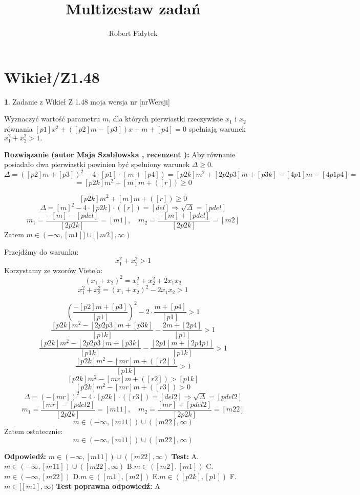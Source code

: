 \documentclass[12pt, a4paper]{article}
\title{Multizestaw zadań}
\author{Robert Fidytek}
\date{}
\theoremstyle{definition} %
\newtheorem{zad}{}
\newcommand{\kategoria}[1]{\section{#1}} %
\newcommand{\zadStart}[1]{\begin{zad}#1\newline} %
\newcommand{\zadStop}{\end{zad}}   %
\newcommand{\rozwStart}[2]{\noindent \textbf{Rozwiązanie (autor #1 , recenzent #2): }\newline} %
\newcommand{\rozwStop}{\newline}                                            %
\newcommand{\odpStart}{\noindent \textbf{Odpowiedź:}\newline}    %
\newcommand{\odpStop}{\newline}                                             %
\newcommand{\testStart}{\noindent \textbf{Test:}\newline} %
\newcommand{\testStop}{\newline} %
\newcommand{\kluczStart}{\noindent \textbf{Test poprawna odpowiedź:}\newline} %
\newcommand{\kluczStop}{\newline} %
\begin{document}
\maketitle


\kategoria{Wikieł/Z1.48}
\zadStart{Zadanie z Wikieł Z 1.48 moja wersja nr [nrWersji]}

Wyznaczyć wartość parametru $m$, dla których pierwiastki rzeczywiste $x_{1}$ i $x_{2}$ równania $[p1]x^{2}+([p2]m-[p3])x+m+[p4]=0$ spełniają warunek $x_{1}^{2}+x_{2}^{2}>1.$
\zadStop

\rozwStart{Maja Szabłowska}{}
Aby równanie posiadało dwa pierwiastki powinien być spełniony warunek $\Delta\geq0.$
$$\Delta=([p2]m+[p3])^{2}-4\cdot[p1]\cdot(m+[p4])=[p2k]m^{2}+[2p2p3]m+[p3k]-[4p1]m-[4p1p4]=$$
$$=[p2k]m^{2}+[m]m+([r])\geq0$$

$$[p2k]m^{2}+[m]m+([r])\geq0$$
$$\Delta=[m]^{2}-4\cdot[p2k]\cdot([r])=[del] \Rightarrow \sqrt{\Delta}=[pdel]$$
$$m_{1}=\frac{-[m]-[pdel]}{[2p2k]}=[m1], \quad m_{2}=\frac{-[m]+[pdel]}{[2p2k]}=[m2]$$
Zatem $m\in(-\infty,[m1]]\cup[[m2],\infty)$

Przejdźmy do warunku:
$$x_{1}^{2}+x_{2}^{2}>1$$
Korzystamy ze wzorów Viete'a:
$$(x_{1}+x_{2})^{2}=x_{1}^{2}+x_{2}^{2}+2x_{1}x_{2}$$
$$x_{1}^{2}+x_{2}^{2}=(x_{1}+x_{2})^{2}-2x_{1}x_{2}>1$$

$$\left(\frac{-[p2]m+[p3]}{[p1]}\right)^{2}-2\cdot \frac{m+[p4]}{[p1]}>1$$
$$\frac{[p2k]m^{2}-[2p2p3]m+[p3k]}{[p1k]}-\frac{2m+[2p4]}{[p1]}>1$$
$$\frac{[p2k]m^{2}-[2p2p3]m+[p3k]}{[p1k]}-\frac{[2p1]m+[2p4p1]}{[p1k]}>1$$
$$\frac{[p2k]m^{2}-[mr]m+([r2])}{[p1k]}>1$$
$$[p2k]m^{2}-[mr]m+([r2])>[p1k]$$
$$[p2k]m^{2}-[mr]m+([r3])>0$$
$$\Delta=(-[mr])^{2}-4\cdot[p2k]\cdot([r3])=[del2] \Rightarrow \sqrt{\Delta}=[pdel2]$$
$$m_{1}=\frac{[mr]-[pdel2]}{[2p2k]}=[m11], \quad m_{2}=\frac{[mr]+[pdel2]}{[2p2k]}=[m22]$$
$$m\in(-\infty, [m11])\cup([m22],\infty)$$
Zatem ostatecznie:
$$m\in(-\infty, [m11])\cup([m22],\infty)$$
\rozwStop


\odpStart
$m\in(-\infty, [m11])\cup([m22],\infty)$
\odpStop
\testStart
A.$m\in(-\infty, [m11])\cup([m22],\infty)$
B.$m\in([m2],[m1])$
C.$m\in(-\infty,[m22])$
D.$m\in([m1],[m2])$
E.$m\in([p2k],[p1])$
F.$m\in[[m1],\infty)$
\testStop
\kluczStart
A
\kluczStop
\end{document}
